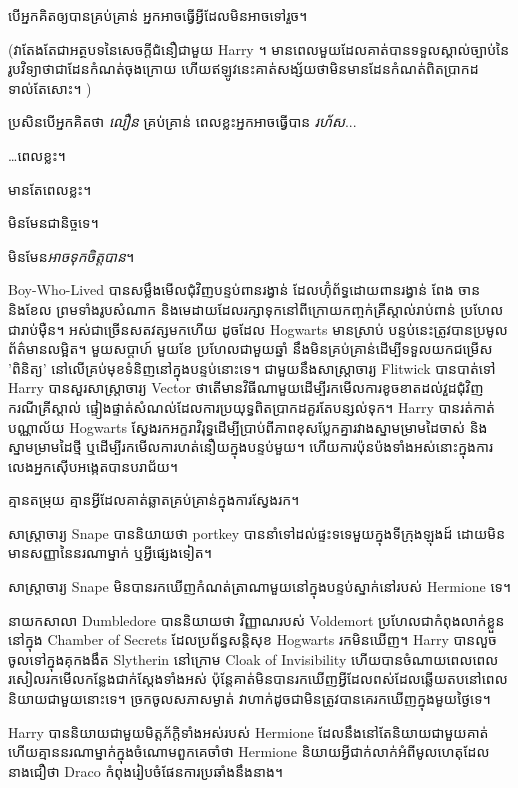 {{{{{\later

បើ​អ្នក​គិត​ឲ្យ​បាន​គ្រប់គ្រាន់ អ្នក​អាច​ធ្វើ​អ្វី​ដែល​មិន​អាច​ទៅ​រួច។

(វាតែងតែជាអត្ថបទនៃសេចក្តីជំនឿជាមួយ Harry ។ មានពេលមួយដែលគាត់បានទទួលស្គាល់ច្បាប់នៃរូបវិទ្យាថាជាដែនកំណត់ចុងក្រោយ ហើយឥឡូវនេះគាត់សង្ស័យថាមិនមានដែនកំណត់ពិតប្រាកដទាល់តែសោះ។ )

ប្រសិនបើអ្នកគិតថា \emph{លឿន} គ្រប់គ្រាន់ ពេលខ្លះអ្នកអាចធ្វើបាន \emph{រហ័ស}...

…ពេលខ្លះ។

មានតែពេលខ្លះ។

មិនមែនជានិច្ចទេ។

មិនមែន\emph{អាចទុកចិត្តបាន}។

Boy-Who-Lived បានសម្លឹងមើលជុំវិញបន្ទប់ពានរង្វាន់ ដែលហ៊ុំព័ទ្ធដោយពានរង្វាន់ ពែង ចាន និងខែល ព្រមទាំងរូបសំណាក និងមេដាយដែលរក្សាទុកនៅពីក្រោយកញ្ចក់គ្រីស្តាល់រាប់ពាន់ ប្រហែលជារាប់ម៉ឺន។ អស់ជាច្រើនសតវត្សមកហើយ ដូចដែល Hogwarts មានស្រាប់ បន្ទប់នេះត្រូវបានប្រមូលព័ត៌មានលម្អិត។ មួយសប្តាហ៍ មួយខែ ប្រហែលជាមួយឆ្នាំ នឹងមិនគ្រប់គ្រាន់ដើម្បីទទួលយកជម្រើស 'ពិនិត្យ' នៅលើគ្រប់មុខទំនិញនៅក្នុងបន្ទប់នោះទេ។ ជាមួយនឹងសាស្រ្តាចារ្យ Flitwick បានបាត់ទៅ Harry បានសួរសាស្រ្តាចារ្យ Vector ថាតើមានវិធីណាមួយដើម្បីរកមើលការខូចខាតដល់វួដជុំវិញករណីគ្រីស្តាល់ ផ្ទៀងផ្ទាត់សំណល់ដែលការប្រយុទ្ធពិតប្រាកដគួរតែបន្សល់ទុក។ Harry បានរត់កាត់បណ្ណាល័យ Hogwarts ស្វែងរកអក្ខរាវិរុទ្ធដើម្បីប្រាប់ពីភាពខុសប្លែកគ្នារវាងស្នាមម្រាមដៃចាស់ និងស្នាមម្រាមដៃថ្មី ឬដើម្បីរកមើលការហត់នឿយក្នុងបន្ទប់មួយ។ ហើយការប៉ុនប៉ងទាំងអស់នោះក្នុងការលេងអ្នកស៊ើបអង្កេតបានបរាជ័យ។

គ្មាន​តម្រុយ គ្មាន​អ្វី​ដែល​គាត់​ឆ្លាត​គ្រប់​គ្រាន់​ក្នុង​ការ​ស្វែង​រក។

សាស្រ្តាចារ្យ Snape បាននិយាយថា portkey បាននាំទៅដល់ផ្ទះទទេមួយក្នុងទីក្រុងឡុងដ៍ ដោយមិនមានសញ្ញានៃនរណាម្នាក់ ឬអ្វីផ្សេងទៀត។

សាស្រ្តាចារ្យ Snape មិនបានរកឃើញកំណត់ត្រាណាមួយនៅក្នុងបន្ទប់ស្នាក់នៅរបស់ Hermione ទេ។

នាយកសាលា Dumbledore បាននិយាយថា វិញ្ញាណរបស់ Voldemort ប្រហែលជាកំពុងលាក់ខ្លួននៅក្នុង Chamber of Secrets ដែលប្រព័ន្ធសន្តិសុខ Hogwarts រកមិនឃើញ។ Harry បានលួចចូលទៅក្នុងគុកងងឹត Slytherin នៅក្រោម Cloak of Invisibility ហើយបានចំណាយពេលពេលរសៀលរកមើលកន្លែងជាក់ស្តែងទាំងអស់ ប៉ុន្តែគាត់មិនបានរកឃើញអ្វីដែលពស់ដែលឆ្លើយតបនៅពេលនិយាយជាមួយនោះទេ។ ច្រកចូលសភាសម្ងាត់ វាហាក់ដូចជាមិនត្រូវបានគេរកឃើញក្នុងមួយថ្ងៃទេ។

Harry បាននិយាយជាមួយមិត្តភ័ក្តិទាំងអស់របស់ Hermione ដែលនឹងនៅតែនិយាយជាមួយគាត់ ហើយគ្មាននរណាម្នាក់ក្នុងចំណោមពួកគេចាំថា Hermione និយាយអ្វីជាក់លាក់អំពីមូលហេតុដែលនាងជឿថា Draco កំពុងរៀបចំផែនការប្រឆាំងនឹងនាង។

}}}}}
